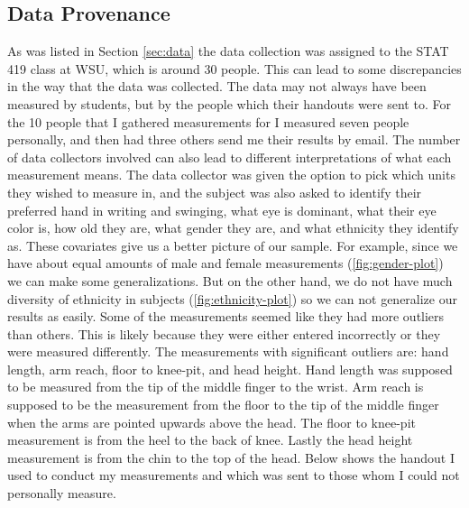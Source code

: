 \documentclass[]{article}
\begin{document}
\subsection{Data Provenance}
\label{sec:appendix-data-provenance}

As was listed in Section \ref{sec:data} the data collection was assigned
to the STAT 419 class at WSU, which is around 30 people. This can lead
to some discrepancies in the way that the data was collected. The data
may not always have been measured by students, but by the people which
their handouts were sent to. For the 10 people that I gathered
measurements for I measured seven people personally, and then had three
others send me their results by email. The number of data collectors
involved can also lead to different interpretations of what each
measurement means. \newline\newline The data collector was given the
option to pick which units they wished to measure in, and the subject
was also asked to identify their preferred hand in writing and swinging,
what eye is dominant, what their eye color is, how old they are, what
gender they are, and what ethnicity they identify as. These covariates
give us a better picture of our sample. For example, since we have about
equal amounts of male and female measurements (\ref{fig:gender-plot}) we
can make some generalizations. But on the other hand, we do not have
much diversity of ethnicity in subjects (\ref{fig:ethnicity-plot}) so we
can not generalize our results as easily. \newline\newline Some of the
measurements seemed like they had more outliers than others. This is
likely because they were either entered incorrectly or they were
measured differently. The measurements with significant outliers are:
hand length, arm reach, floor to knee-pit, and head height. Hand length
was supposed to be measured from the tip of the middle finger to the
wrist. Arm reach is supposed to be the measurement from the floor to the
tip of the middle finger when the arms are pointed upwards above the
head. The floor to knee-pit measurement is from the heel to the back of
knee. Lastly the head height measurement is from the chin to the top of
the head. \newline\newline Below shows the handout I used to conduct my
measurements and which was sent to those whom I could not personally
measure. \newpage
\end{document}
